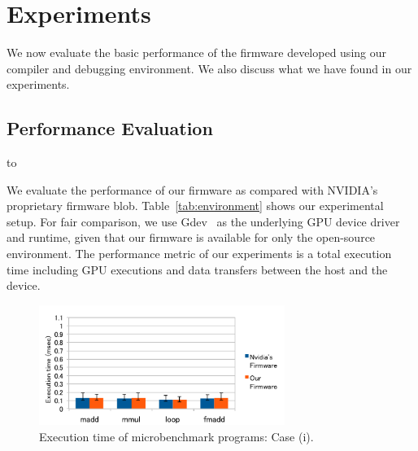 

\section{Experiments}\label{sec:evaluation}

We now evaluate the basic performance of the firmware developed using
our compiler and debugging environment.
We also discuss what we have found in our experiments.

\subsection{Performance Evaluation}

\begin{table}[!t]
 \caption{Experimental setup.} 
 \label{tab:environment}
 \hbox to
\end{table}

We evaluate the performance of our firmware as compared with NVIDIA's
proprietary firmware blob.
Table~\ref{tab:environment} shows our experimental setup.
For fair comparison, we use Gdev~\cite{Kato_ATC12} as the underlying GPU
device driver and runtime, given that our firmware is available for only
the open-source environment.
The performance metric of our experiments is a total execution time
including GPU executions and data transfers between the host and the
device.

\begin{figure}
 \begin{center}
  \hfil
  \includegraphics[width=8cm]{./img/good_case.pdf}
 \end{center}
 \caption{Execution time of microbenchmark programs: Case (i).}
 \label{fig:goodcase}
\end{figure}

